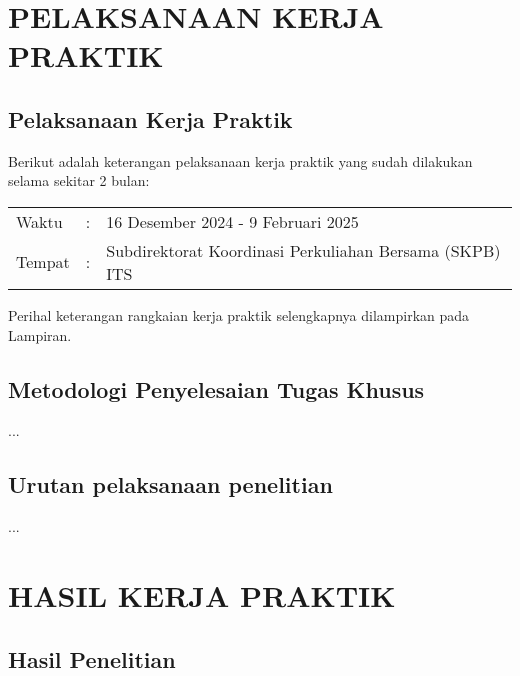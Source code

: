 \documentclass{file/KP-ITS}
\theoremstyle{definition}
\theoremstyle{definition}
\theoremstyle{plain}
\begin{document}




\pagebreak
\chapter{PELAKSANAAN KERJA PRAKTIK}

\section{Pelaksanaan Kerja Praktik}
Berikut adalah keterangan pelaksanaan kerja praktik yang sudah dilakukan selama sekitar 2 bulan:
\begin{flushleft}
\begin{tabular}{lcp{}}
    Waktu	&:& 16 Desember 2024 - 9 Februari 2025 \\
    Tempat	&:& Subdirektorat Koordinasi Perkuliahan Bersama (SKPB) ITS
\end{tabular}
\end{flushleft}
\noindent Perihal keterangan rangkaian kerja praktik selengkapnya dilampirkan pada Lampiran.

\section{Metodologi Penyelesaian Tugas Khusus}
...


\section{Urutan pelaksanaan penelitian}
...


\chapter{HASIL KERJA PRAKTIK}

\section{Hasil Penelitian}

\end{document}
